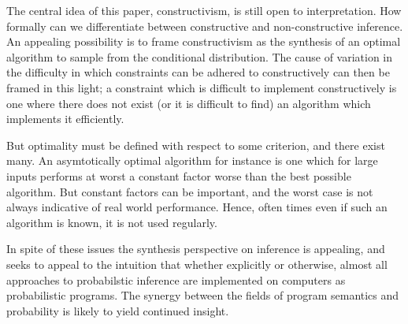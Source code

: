 The central idea of this paper, constructivism, is still open to interpretation.
How formally can we differentiate between constructive and non-constructive inference.
An appealing possibility is to frame constructivism as the synthesis of an optimal algorithm to sample from the conditional distribution.
The cause of variation in the difficulty in which constraints can be adhered to constructively can then be framed in this light; a constraint which is difficult to implement constructively is one where there does not exist (or it is difficult to find) an algorithm which implements it efficiently.

But optimality must be defined with respect to some criterion, and there exist many.
An asymtotically optimal algorithm for instance is one which for large inputs performs at worst a constant factor worse than the best possible algorithm.
But constant factors can be important, and the worst case is not always indicative of real world performance.
Hence, often times even if such an algorithm is known, it is not used regularly.

In spite of these issues the synthesis perspective on inference is appealing, and seeks to appeal to the intuition that whether explicitly or otherwise, almost all approaches to probabilstic inference are implemented on computers as probabilistic programs.
The synergy between the fields of program semantics and probability is likely to yield continued insight.





